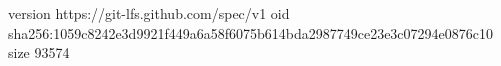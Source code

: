 version https://git-lfs.github.com/spec/v1
oid sha256:1059c8242e3d9921f449a6a58f6075b614bda2987749ce23e3c07294e0876c10
size 93574
